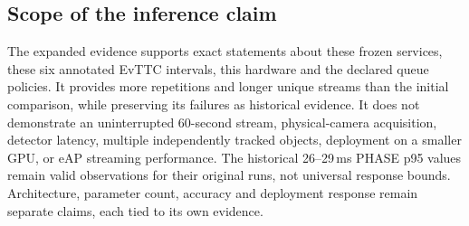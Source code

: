 \begingroup\footnotesize

\endgroup

\begingroup\footnotesize

\endgroup

\subsection{Scope of the inference claim}

The expanded evidence supports exact statements about these frozen services, these six annotated EvTTC intervals, this hardware and the declared queue policies. It provides more repetitions and longer unique streams than the initial comparison, while preserving its failures as historical evidence. It does not demonstrate an uninterrupted 60-second stream, physical-camera acquisition, detector latency, multiple independently tracked objects, deployment on a smaller GPU, or eAP streaming performance. The historical 26--29\,ms PHASE p95 values remain valid observations for their original runs, not universal response bounds. Architecture, parameter count, accuracy and deployment response remain separate claims, each tied to its own evidence.
\FloatBarrier
